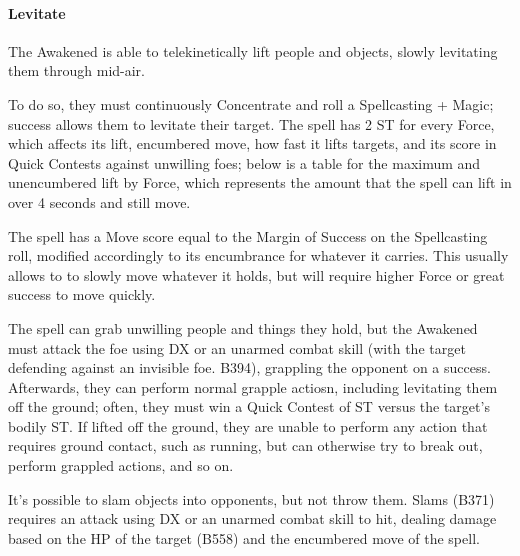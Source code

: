 \begin{multicols*}{3}
	\paragraph{Levitate}
	
	The Awakened is able to telekinetically lift people and objects, slowly levitating them through mid-air.
	
	To do so, they must continuously Concentrate and roll a Spellcasting + Magic; success allows them  to levitate their target. The spell has 2 ST for every Force, which affects its lift, encumbered move, how fast it lifts targets, and its score in Quick Contests against unwilling foes; below is a table for the maximum and unencumbered lift by Force, which represents the amount that the spell can lift in over 4 seconds and still move.
	
	The spell has a Move score equal to the Margin of Success on the Spellcasting roll, modified accordingly to its encumbrance for whatever it carries. This usually allows to to slowly move whatever it holds, but will require higher Force or great success to move quickly.
	
	The spell can grab unwilling people and things they hold, but the Awakened must attack the foe using DX or an unarmed combat skill (with the target defending against an invisible foe. B394), grappling the opponent on a success. Afterwards, they can perform normal grapple actiosn, including levitating them off the ground; often, they must win a Quick Contest of ST versus the target's bodily ST. If lifted off the ground, they are unable to perform any action that requires ground contact, such as running, but can otherwise try to break out, perform grappled actions, and so on.
	
	It's possible to slam objects into opponents, but not throw them. Slams (B371) requires an attack using DX or an unarmed combat skill to hit, dealing damage based on the HP of the target (B558) and the encumbered move of the spell.
		

\end{multicols*}
